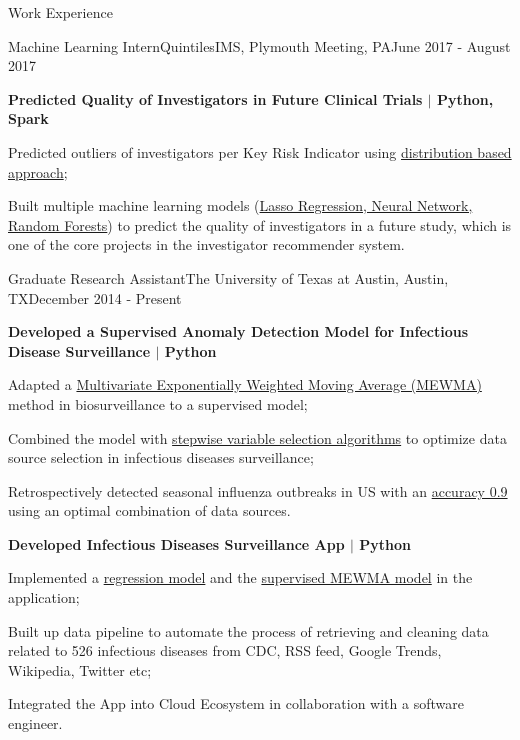 \documentclass{my_resume} %
\begin{document}
\begin{rSection}{Work Experience}

  \begin{rSubsection}{Machine Learning Intern}{QuintilesIMS, Plymouth Meeting,
    PA}{June 2017 - August 2017}

  \item[] \textbf{Predicted Quality of Investigators in Future Clinical Trials
    $|$ Python, Spark}
  \item Predicted outliers of investigators per Key Risk Indicator using
    \underline{distribution based approach};
  \item Built multiple machine learning models (\underline{Lasso Regression, Neural
    Network, Random Forests}) to predict the quality of investigators in a
    future study, which is one of the core projects in the investigator
    recommender system.
  \end{rSubsection}

  \begin{rSubsection}{Graduate Research Assistant}{The University of Texas at
    Austin, Austin, TX}{December 2014 - Present}
  \item[] \textbf{Developed a Supervised Anomaly Detection Model for Infectious
    Disease Surveillance $|$ Python}
    \item Adapted a \underline{Multivariate Exponentially Weighted Moving Average
      (MEWMA)} method in biosurveillance to a supervised model;
    \item Combined the model with \underline{stepwise variable selection
      algorithms} to optimize data source selection in infectious diseases
      surveillance;
    \item Retrospectively detected seasonal influenza outbreaks in US with an
      \underline{accuracy 0.9} using an optimal combination of data sources.
\vspace{1mm}
  \item[] \textbf{Developed Infectious Diseases Surveillance App $|$ Python}
    \item Implemented a \underline{regression model} and the
      \underline{supervised MEWMA model} in the application;
    \item Built up data pipeline to automate the process of retrieving and
      cleaning data related to 526 infectious diseases from CDC, RSS feed, Google
      Trends, Wikipedia, Twitter etc;
    \item Integrated the App into Cloud Ecosystem in collaboration with a
      software engineer.


\end{rSubsection}
\end{rSection}
\end{document}
